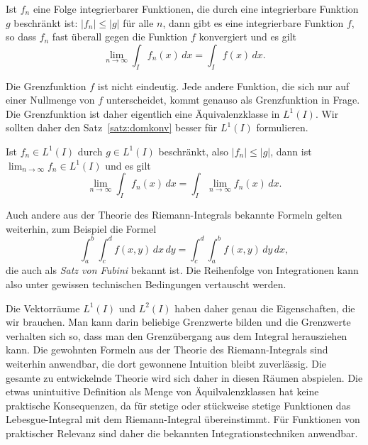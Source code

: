 \begin{satz}[Lebesgue]
\label{satz:domkonv}
Ist $f_n$ eine Folge integrierbarer Funktionen, die durch eine
integrierbare Funktion $g$ beschränkt ist:
$
|f_n| \le |g|
$
für alle $n$, dann gibt es eine integrierbare Funktion $f$, so dass
$f_n$ fast überall gegen die Funktion $f$ konvergiert und es gilt
\[
\lim_{n\to\infty} \int_I f_n(x)\,dx = \int_I f(x)\,dx.
\]
\end{satz}

Die Grenzfunktion $f$ ist nicht eindeutig. 
Jede andere Funktion, die sich nur auf einer Nullmenge von $f$ unterscheidet,
kommt genauso als Grenzfunktion in Frage.
Die Grenzfunktion ist daher eigentlich eine Äquivalenzklasse in $L^1(I)$.
Wir sollten daher den Satz~\ref{satz:domkonv}
besser für $L^1(I)$ formulieren.

\begin{satz}
\label{satz:domkonv}
Ist $f_n\in L^1(I)$ durch $g\in L^1(I)$ beschränkt, also $|f_n|\le |g|$,
dann ist $\lim_{n\to\infty}f_n\in L^1(I)$ und es gilt
\[
\lim_{n\to\infty} \int_I f_n(x)\,dx = \int_I \lim_{n\to\infty} f_n(x)\,dx.
\]
\end{satz}

Auch andere aus der Theorie des Riemann-Integrals bekannte Formeln gelten
weiterhin, zum Beispiel die Formel
\[
\int_a^b \int_c^d f(x,y) \,dx \,dy
=
\int_c^d
\int_a^b
f(x,y)
\,dy
\,dx,
\]
die auch als {\em Satz von Fubini} bekannt ist.
%
Die Reihenfolge von Integrationen kann also unter gewissen
technischen Bedingungen vertauscht werden.

Die Vektorräume $L^1(I)$ und $L^2(I)$ haben daher genau die Eigenschaften,
die wir brauchen.
Man kann darin beliebige Grenzwerte bilden und die Grenzwerte verhalten
sich so, dass man den Grenzübergang aus dem Integral herausziehen kann.
Die gewohnten Formeln aus der Theorie des Riemann-Integrals sind weiterhin
anwendbar, die dort gewonnene Intuition bleibt zuverlässig.
Die gesamte zu entwickelnde Theorie wird sich daher in diesen Räumen
abspielen.
Die etwas unintuitive Definition als Menge von Äquilvalenzklassen hat
keine praktische Konsequenzen, da für stetige oder stückweise stetige
Funktionen das Lebesgue-Integral mit dem Riemann-Integral übereinstimmt.
Für Funktionen von praktischer Relevanz sind daher die bekannten
Integrationstechniken anwendbar.


